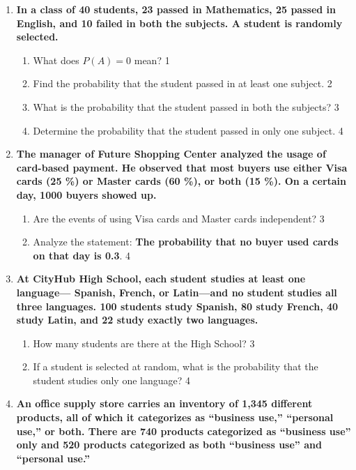 \documentclass[a4paper,oneside]{book}
\begin{document}
\begin{enumerate}
  
   \item
  \textbf{In a class of 40 students, 23 passed in Mathematics, 25 passed in English, and 10 failed in both the subjects. A student is randomly selected.}

  \begin{enumerate}
    \item
	What does $P(A) = 0$ mean? \hfill 1
    \item
	Find the probability that the student passed in at least one subject. \hfill 2
    \item  
	What is the probability that the student passed in both the subjects? \hfill 3
    \item
	Determine the probability that the student passed in only one subject. \hfill 4
  \end{enumerate} 
  
   \item
	  \textbf{The manager of Future Shopping Center analyzed the usage of card-based payment. He observed that most buyers use either Visa cards (25 \%) or Master cards (60 \%), or both (15 \%). On a certain day, 1000 buyers showed up.} 
  
  \begin{enumerate}
    \item  
	Are the events of using Visa cards and Master cards independent? \hfill 3
    \item
	Analyze the statement: \textbf{The probability that no buyer used cards on that day is 0.3}. \hfill 4
  \end{enumerate}
  
   \item
	  \textbf{At CityHub High School, each student studies at least one language— Spanish, French, or Latin—and no student studies all three languages. 100 students study Spanish, 80 study French, 40 study Latin, and 22 study exactly two languages.} 
  
  \begin{enumerate}
    \item  
	How many students are there at the High School? \hfill 3
    \item
	If a student is selected at random, what is the probability that the student studies only one language? \hfill 4
  \end{enumerate}

 \item
	  \textbf{An office supply store carries an inventory of 1,345 different products, all of which it categorizes as “business use,” “personal use,” or both. There are 740 products categorized as “business use” only and 520 products categorized as both “business use” and “personal use.”} 
  

\end{enumerate}
\end{document}
